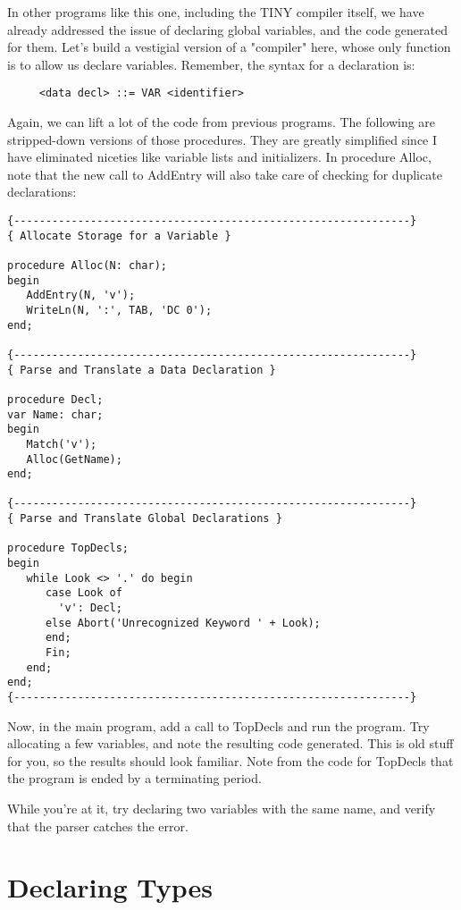 In  other programs like this one, including  the  TINY  compiler itself, we have  already  addressed the issue of declaring global variables, and the  code  generated  for  them. Let's  build a vestigial version of a "compiler" here, whose only function is to allow  us   declare  variables. Remember, the  syntax  for  a declaration is:

\begin{verbatim}
     <data decl> ::= VAR <identifier>
\end{verbatim}

Again, we can lift a lot of the code from previous programs. The following are stripped-down versions of those  procedures. They are greatly simplified  since  I  have  eliminated  niceties like variable lists and  initializers. In procedure Alloc, note that the  new call to AddEntry will also  take  care  of  checking for duplicate declarations:

\begin{verbatim}
{--------------------------------------------------------------}
{ Allocate Storage for a Variable }

procedure Alloc(N: char);
begin
   AddEntry(N, 'v');
   WriteLn(N, ':', TAB, 'DC 0');
end;

{--------------------------------------------------------------}
{ Parse and Translate a Data Declaration }

procedure Decl;
var Name: char;
begin
   Match('v');
   Alloc(GetName);
end;

{--------------------------------------------------------------}
{ Parse and Translate Global Declarations }

procedure TopDecls;
begin
   while Look <> '.' do begin
      case Look of
        'v': Decl;
      else Abort('Unrecognized Keyword ' + Look);
      end;
      Fin;
   end;
end;
{--------------------------------------------------------------}
\end{verbatim}

Now, in the  main  program, add  a  call to TopDecls and run the program. Try allocating a  few variables, and note the resulting code generated. This is old stuff for you, so the results should look familiar. Note from the code for TopDecls that  the program is ended by a terminating period.

While you're at it, try  declaring  two  variables with the same name, and verify that the parser catches the error.

\section{Declaring Types}

